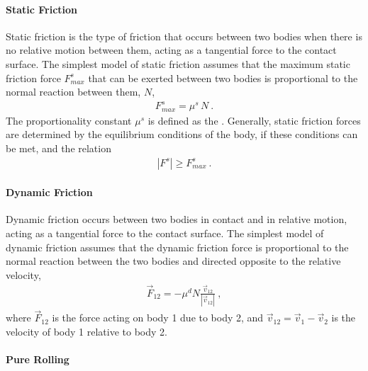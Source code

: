 \documentclass[letterpaper,10pt,english]{jupyterBook}
\begin{document}
\paragraph{Static Friction}
\label{\detokenize{ch/actions-reactions:static-friction}}
\sphinxAtStartPar
Static friction is the type of friction that occurs between two bodies when there is no relative motion between them, acting as a tangential force to the contact surface. The simplest model of static friction assumes that the maximum static friction force \(F^s_{max}\) that can be exerted between two bodies is proportional to the normal reaction between them, \(N\),
\begin{equation*}
\begin{split}F^s_{max} = \mu^s \, N \ .\end{split}
\end{equation*}
\sphinxAtStartPar
The proportionality constant \(\mu^s\) is defined as the . Generally, static friction forces are determined by the equilibrium conditions of the body, if these conditions can be met, and the relation
\begin{equation*}
\begin{split}|F^s| \ge F^s_{max} \ .\end{split}
\end{equation*}

\paragraph{Dynamic Friction}
\label{\detokenize{ch/actions-reactions:dynamic-friction}}
\sphinxAtStartPar
Dynamic friction occurs between two bodies in contact and in relative motion, acting as a tangential force to the contact surface. The simplest model of dynamic friction assumes that the dynamic friction force is proportional to the normal reaction between the two bodies and directed opposite to the relative velocity,
\begin{equation*}
\begin{split}\vec{F}_{12} = - \mu^d N \frac{\vec{v}_{12}}{|\vec{v}_{12}|} \ ,\end{split}
\end{equation*}
\sphinxAtStartPar
where \(\vec{F}_{12}\) is the force acting on body 1 due to body 2, and \(\vec{v}_{12} = \vec{v}_1 - \vec{v}_2\) is the velocity of body 1 relative to body 2.


\paragraph{Pure Rolling}
\label{\detokenize{ch/actions-reactions:pure-rolling}}
\sphinxAtStartPar
{} 
\end{document}
